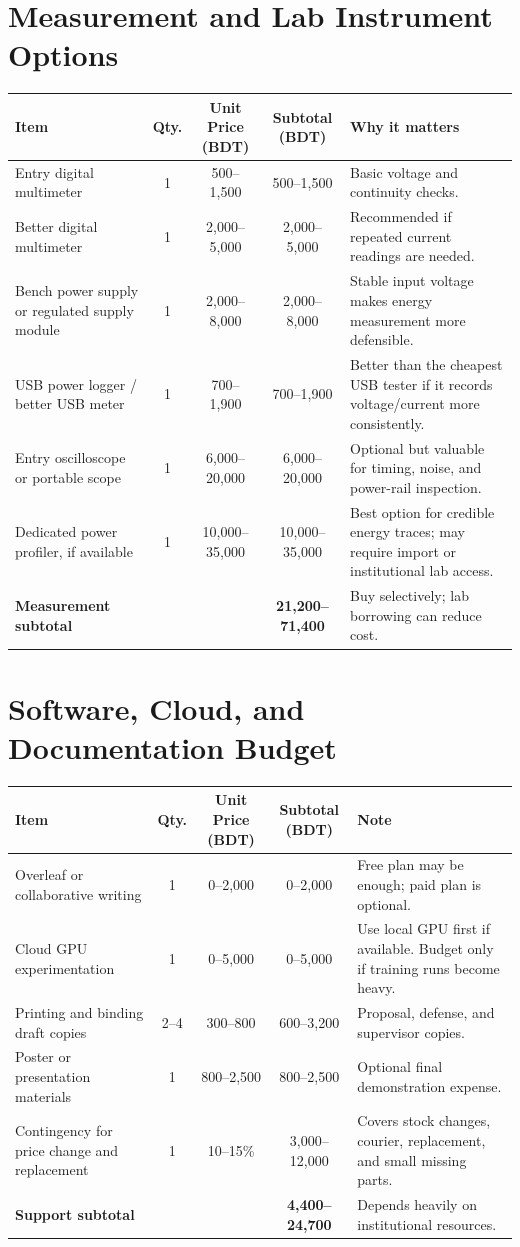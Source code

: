 \documentclass[11pt]{article}
\begin{document}
\section*{Measurement and Lab Instrument Options}
\small
\begin{tabular}{p{4.1cm}cccp{4.9cm}}
\toprule
Item & Qty. & Unit Price (BDT) & Subtotal (BDT) & Why it matters \\
\midrule
Entry digital multimeter & 1 & 500--1,500 & 500--1,500 & Basic voltage and continuity checks. \\
Better digital multimeter & 1 & 2,000--5,000 & 2,000--5,000 & Recommended if repeated current readings are needed. \\
Bench power supply or regulated supply module & 1 & 2,000--8,000 & 2,000--8,000 & Stable input voltage makes energy measurement more defensible. \\
USB power logger / better USB meter & 1 & 700--1,900 & 700--1,900 & Better than the cheapest USB tester if it records voltage/current more consistently. \\
Entry oscilloscope or portable scope & 1 & 6,000--20,000 & 6,000--20,000 & Optional but valuable for timing, noise, and power-rail inspection. \\
Dedicated power profiler, if available & 1 & 10,000--35,000 & 10,000--35,000 & Best option for credible energy traces; may require import or institutional lab access. \\
\midrule
\textbf{Measurement subtotal} & & & \textbf{21,200--71,400} & Buy selectively; lab borrowing can reduce cost. \\
\bottomrule
\end{tabular}
\normalsize

\section*{Software, Cloud, and Documentation Budget}
\small
\begin{tabular}{p{4.2cm}cccp{4.8cm}}
\toprule
Item & Qty. & Unit Price (BDT) & Subtotal (BDT) & Note \\
\midrule
Overleaf or collaborative writing & 1 & 0--2,000 & 0--2,000 & Free plan may be enough; paid plan is optional. \\
Cloud GPU experimentation & 1 & 0--5,000 & 0--5,000 & Use local GPU first if available. Budget only if training runs become heavy. \\
Printing and binding draft copies & 2--4 & 300--800 & 600--3,200 & Proposal, defense, and supervisor copies. \\
Poster or presentation materials & 1 & 800--2,500 & 800--2,500 & Optional final demonstration expense. \\
Contingency for price change and replacement & 1 & 10--15\% & 3,000--12,000 & Covers stock changes, courier, replacement, and small missing parts. \\
\midrule
\textbf{Support subtotal} & & & \textbf{4,400--24,700} & Depends heavily on institutional resources. \\
\bottomrule
\end{tabular}
\normalsize
\end{document}
